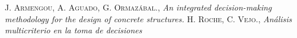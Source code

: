 \documentclass[10pt]{article}
\begin{document}
\begin{thebibliography}{a}
 \textsc{J. Armengou, A. Aguado, G. Ormazábal.},
\textit{An integrated decision-making methodology for the design of concrete structures.}
 \textsc{H. Roche, C. Vejo.},
\textit{Análisis multicriterio en la toma de decisiones}
\end{thebibliography}
\end{document}
